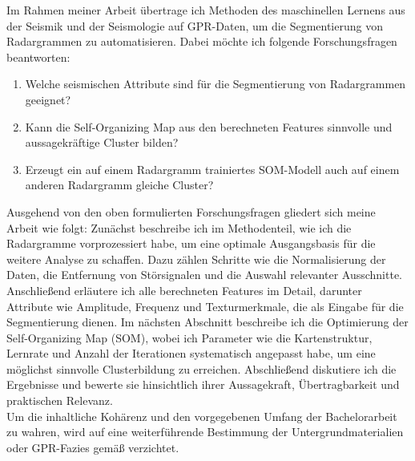 Im Rahmen meiner Arbeit übertrage ich Methoden des maschinellen Lernens aus der Seismik und der Seismologie auf GPR-Daten, um die Segmentierung von Radargrammen zu automatisieren. Dabei möchte ich folgende Forschungsfragen beantworten:

\begin{enumerate}
    \item Welche seismischen Attribute sind für die Segmentierung von Radargrammen geeignet?
    \item Kann die Self-Organizing Map aus den berechneten Features sinnvolle und aussagekräftige Cluster bilden?
    \item Erzeugt ein auf einem Radargramm trainiertes SOM-Modell auch auf einem anderen Radargramm gleiche Cluster?
\end{enumerate}
Ausgehend von den oben formulierten Forschungsfragen gliedert sich meine Arbeit wie folgt: Zunächst beschreibe ich im Methodenteil, wie ich die Radargramme vorprozessiert habe, um eine optimale Ausgangsbasis für die weitere Analyse zu schaffen. Dazu zählen Schritte wie die Normalisierung der Daten, die Entfernung von Störsignalen und die Auswahl relevanter Ausschnitte. Anschließend erläutere ich alle berechneten Features im Detail, darunter Attribute wie Amplitude, Frequenz und Texturmerkmale, die als Eingabe für die Segmentierung dienen. Im nächsten Abschnitt beschreibe ich die Optimierung der Self-Organizing Map (SOM), wobei ich Parameter wie die Kartenstruktur, Lernrate und Anzahl der Iterationen systematisch angepasst habe, um eine möglichst sinnvolle Clusterbildung zu erreichen. Abschließend diskutiere ich die Ergebnisse und bewerte sie hinsichtlich ihrer Aussagekraft, Übertragbarkeit und praktischen Relevanz. \\
Um die inhaltliche Kohärenz und den vorgegebenen Umfang der Bachelorarbeit zu wahren, wird auf eine weiterführende Bestimmung der Untergrundmaterialien oder GPR-Fazies gemäß \textcite{corradini_day_2023} verzichtet.